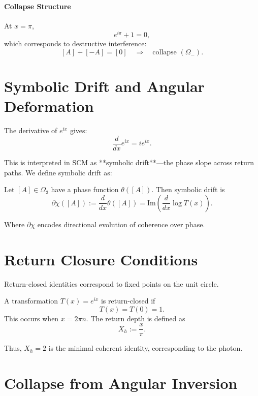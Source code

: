 \paragraph{Collapse Structure}
At \( x = \pi \),
\[
e^{i\pi} + 1 = 0,
\]
which corresponds to destructive interference:
\[
[A] + [-A] = [0] \quad \Rightarrow \quad \text{collapse } (\Omega_-).
\]

\section{Symbolic Drift and Angular Deformation}

The derivative of \( e^{ix} \) gives:
\begin{equation}
    \frac{d}{dx} e^{ix} = i e^{ix}.
\end{equation}

This is interpreted in SCM as **symbolic drift**—the phase slope across return paths. We define symbolic drift as:

\begin{definition}
Let \( [A] \in \Omega_3 \) have a phase function \( \theta([A]) \). Then symbolic drift is
\[
\partial \chi([A]) := \frac{d}{dx} \theta([A]) = \text{Im} \left( \frac{d}{dx} \log T(x) \right).
\]
\end{definition}

\noindent Where \( \partial \chi \) encodes directional evolution of coherence over phase.

\section{Return Closure Conditions}

Return-closed identities correspond to fixed points on the unit circle.

\begin{definition}
A transformation \( T(x) = e^{ix} \) is return-closed if
\[
T(x) = T(0) = 1.
\]
This occurs when \( x = 2\pi n \). The return depth is defined as
\[
X_h := \frac{x}{\pi}.
\]
\end{definition}

\noindent Thus, \( X_h = 2 \) is the minimal coherent identity, corresponding to the photon.

\section{Collapse from Angular Inversion}

